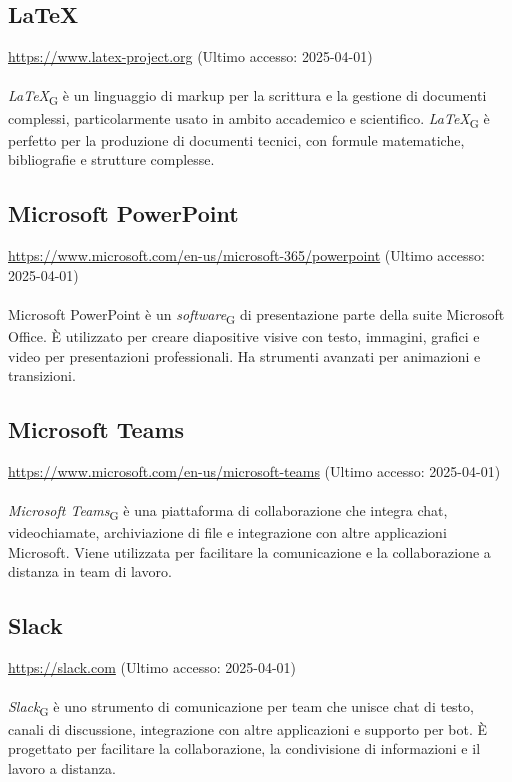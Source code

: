 \subsection{LaTeX}
\label{LaTeX}
\href{https://www.latex-project.org}{https://www.latex-project.org} (Ultimo accesso: 2025-04-01) \\ \\  
\textit{LaTeX}\textsubscript{G} è un linguaggio di markup per la scrittura e la gestione di documenti complessi, particolarmente usato in ambito accademico e scientifico. \textit{LaTeX}\textsubscript{G} è perfetto per la produzione di documenti tecnici, con formule matematiche, bibliografie e strutture complesse.

\subsection{Microsoft PowerPoint}
\label{Microsoft PowerPoint}
\href{https://www.microsoft.com/en-us/microsoft-365/powerpoint}{https://www.microsoft.com/en-us/microsoft-365/powerpoint} (Ultimo accesso: 2025-04-01) \\ \\  
Microsoft PowerPoint è un \textit{software}\textsubscript{G} di presentazione parte della suite Microsoft Office. È utilizzato per creare diapositive visive con testo, immagini, grafici e video per presentazioni professionali. Ha strumenti avanzati per animazioni e transizioni.

\subsection{Microsoft Teams}
\label{Microsoft Teams}
\href{https://www.microsoft.com/en-us/microsoft-teams}{https://www.microsoft.com/en-us/microsoft-teams} (Ultimo accesso: 2025-04-01) \\ \\  
\textit{Microsoft Teams}\textsubscript{G} è una piattaforma di collaborazione che integra chat, videochiamate, archiviazione di file e integrazione con altre applicazioni Microsoft. Viene utilizzata per facilitare la comunicazione e la collaborazione a distanza in team di lavoro.

\subsection{Slack}
\label{Slack}
\href{https://slack.com}{https://slack.com} (Ultimo accesso: 2025-04-01) \\ \\  
\textit{Slack}\textsubscript{G} è uno strumento di comunicazione per team che unisce chat di testo, canali di discussione, integrazione con altre applicazioni e supporto per bot. È progettato per facilitare la collaborazione, la condivisione di informazioni e il lavoro a distanza.

